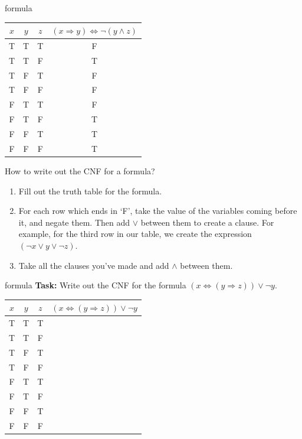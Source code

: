 \documentclass{beamer}
\begin{document}
\begin{frame}{formula}
\begin{center}
\begin{tabular}{|c|c|c|c|}
\hline
$x$ & $y$ & $z$ & $(x \Rightarrow y) \Leftrightarrow \neg (y \land z)$\\
\hline
\color{red} T & \color{red} T & \color{red} T & \color{red} F\\
\hline
T & T & F & T\\
\hline
\color{red} T & \color{red} F & \color{red} T & \color{red} F\\
\hline
\color{red} T & \color{red} F & \color{red} F & \color{red} F\\
\hline
\color{red} F & \color{red} T & \color{red} T & \color{red} F\\
\hline
F & T & F & T\\
\hline
F & F & T & T\\
\hline
F & F & F & T\\
\hline
\end{tabular}
\end{center}
How to write out the CNF for a formula?
\begin{enumerate}[label=(\arabic*)]
\item Fill out the truth table for the formula.
\item For each row which ends in `F', take the value of the variables coming before it, and negate them. Then add $\lor$ between them to create a clause. For example, for the third row in our table, we create the expression $(\neg x \lor y \lor \neg z)$.
\item Take all the clauses you've made and add $\land$ between them.
\end{enumerate}
\end{frame}

\begin{frame}{formula}
\textbf{Task: } Write out the CNF for the formula $(x \Leftrightarrow (y \Rightarrow z)) \lor \neg y$.
\begin{center}
\begin{tabular}{|c|c|c|c|}
\hline
$x$ & $y$ & $z$ & $(x \Leftrightarrow (y \Rightarrow z)) \lor \neg y$\\
\hline
T & T & T & \\
\hline
T & T & F & \\
\hline
T & F & T & \\
\hline
T & F & F & \\
\hline
F & T & T & \\
\hline
F & T & F & \\
\hline
F & F & T & \\
\hline
F & F & F & \\
\hline
\end{tabular}
\end{center}
\end{frame}
\end{document}

